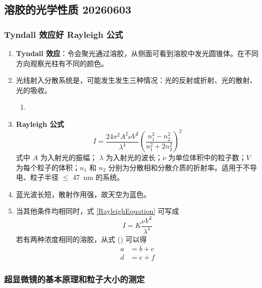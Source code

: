\subsection{溶胶的光学性质 20260603}

\subsubsection{Tyndall 效应好 Rayleigh 公式}

\begin{enumerate}
    \item \textbf{Tyndall 效应}：令会聚光通过溶胶，从侧面可看到溶胶中发光圆锥体。在不同方向观察光柱有不同的颜色。
    \item 光线射入分散系统是，可能发生发生三种情况：光的反射或折射、光的散射、光的吸收。
    \begin{enumerate}
        \item %
    \end{enumerate}
    \item \textbf{Rayleigh 公式}
    \begin{equation}
        I = \frac{24\pi^2 A^2 \nu V^2}{\lambda^4}\left(\frac{n^2_1 - n^2_2}{n^2_1 + 2n^2_2}\right)^2
        \label{RayleighEquation}
    \end{equation}
    式中 $A$ 为入射光的振幅； $\lambda$ 为入射光的波长；$\nu$ 为单位体积中的粒子数；$V$ 为每个粒子的体积；$n_1$ 和 $n_2$ 分别为分散相和分散介质的折射率。适用于不导电、粒子半径 $\leq$ \qty{47}{\nano\meter} 的系统。
    \item 蓝光波长短，散射作用强，故天空为蓝色。
    \item 当其他条件均相同时，式 \eqref{RayleighEquation} 可写成
    \begin{equation*}
        I = K \frac{\nu V^2}{\lambda^4}
    \end{equation*}
    若有两种浓度相同的溶胶，从式 () 可以得
   \begin{subequations}
        \label{eq:group_14.1}
        \begin{align}
            a &= b + c \label{eq:14.1_a} \\
            d &= e + f \label{eq:14.1_b}
        \end{align}
    \end{subequations}
\end{enumerate}

\subsubsection{超显微镜的基本原理和粒子大小的测定}


